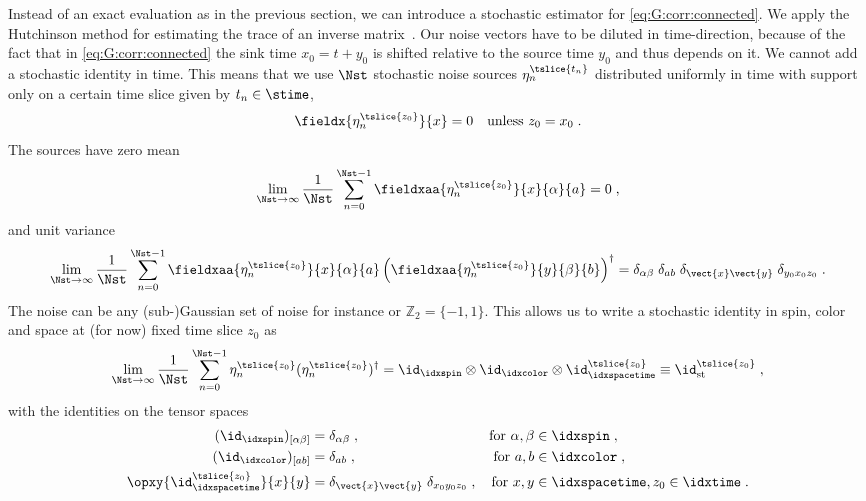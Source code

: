 Instead of an exact evaluation as in the previous section, we can introduce a stochastic estimator for \cref{eq:G:corr:connected}.
We apply the Hutchinson method for estimating the trace of an inverse matrix~\cite{Hutchinson01011990,Michael:1998sg}.
Our noise vectors have to be diluted in time-direction, because of the fact that in \cref{eq:G:corr:connected} the sink time $x_0 = t + y_0$ is shifted relative to the source time $y_0$ and thus depends on it.
We cannot add a stochastic identity in time.
This means that we use $\Nst$ stochastic noise sources $\eta_n^{\tslice{t_n}}$ distributed uniformly in time with support only on a certain time slice given by $t_n \in \stime$,
\begin{equation} \label{eq:stoch:time_dilution}
\fieldx{\eta^{\tslice{z_0}}_n}{x} = 0
\quad
\text{unless } z_0 = x_0 \;.
\end{equation}
The sources have zero mean
\begin{equation}
\lim_{\Nst \to \infty}
  \frac{1}{\Nst}
    \sum_{n=0}^{\Nst-1}
      \fieldxaa{\eta^{\tslice{z_0}}_{n}}{x}{\alpha}{a}
 = 0 \;,
\end{equation}
and unit variance
\begin{equation}
\lim_{\Nst \to \infty}
  \frac{1}{\Nst}
    \sum_{n=0}^{\Nst-1}
      \fieldxaa{\eta^{\tslice{z_0}}_{n}}{x}{\alpha}{a}
      \left( \fieldxaa{\eta_n^{\tslice{z_0}}}{y}{\beta}{b} \right)^{\dagger}
=
\delta_{\alpha \beta} \;
\delta_{ab} \;
\delta_{\vect{x} \vect{y}} \;
\delta_{y_0 x_0 z_0} \;.
\end{equation}
The noise can be any (sub-)Gaussian set of noise for instance  or $\mathbb{Z}_2 = \{-1, 1\}$.
This allows us to write a stochastic identity in spin, color and space at (for now) fixed time slice $z_0$ as
\begin{equation} \label{eq:stoch:id}
\lim_{\Nst \to \infty}
  \frac{1}{\Nst}
    \sum_{n=0}^{\Nst-1}
      \eta_n^{\tslice{z_0}}
      (\eta_n^{\tslice{z_0}})^{\dagger}
= \id_{\idxspin} \otimes \id_{\idxcolor} \otimes \id^{\tslice{z_0}}_{\idxspacetime}
\equiv \id^{\tslice{z_0}}_{\text{st}} \;,
\end{equation}
with the identities on the tensor spaces %
\begin{align}
(\id_{\idxspin})_{[\alpha \beta]} &= \delta_{\alpha \beta} \;,
&\text{for } \alpha, \beta &\in \idxspin \;, \\
(\id_{\idxcolor})_{[ab]} &= \delta_{ab} \;,
&\text{for } a, b &\in \idxcolor \;, \\
\opxy{\id^{\tslice{z_0}}_{\idxspacetime}}{x}{y} &= \delta_{\vect{x} \vect{y}} \; \delta_{x_0 y_0 z_0} \;,
&\text{for } x, y &\in \idxspacetime, z_0 \in \idxtime \;.
\end{align}

